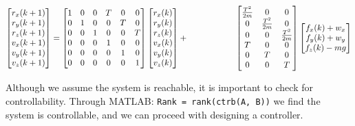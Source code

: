 \documentclass[conference, tikz]{IEEEtran}
\begin{document}
\begin{equation}
    \begin{bmatrix}
        r_x(k+1)\\
        r_y(k+1)\\
        r_z(k+1)\\
        v_x(k+1)\\
        v_y(k+1)\\
        v_z(k+1)\\
    \end{bmatrix}
    =
    \begin{bmatrix}
       1 & 0 & 0 & T & 0 & 0\\
       0 & 1 & 0 & 0 & T & 0\\
       0 & 0 & 1 & 0 & 0 & T\\
       0 & 0 & 0 & 1 & 0 & 0\\
       0 & 0 & 0 & 0 & 1 & 0\\
       0 & 0 & 0 & 0 & 0 & 1
    \end{bmatrix}
    \begin{bmatrix}
        r_x(k)\\
        r_y(k)\\
        r_z(k)\\
        v_x(k)\\
        v_y(k)\\
        v_z(k)\\
    \end{bmatrix}
    +
    \hspace*{2cm}

    \begin{bmatrix}
        \frac{T^2}{2m} & 0 & 0\\
        0 & \frac{T^2}{2m} & 0\\
        0 & 0 & \frac{T^2}{2m}\\
        T & 0 & 0\\
        0 & T & 0\\
        0 & 0 & T
    \end{bmatrix}
    \begin{bmatrix}
        f_x(k)+w_x\\
        f_y(k)+w_y\\
        f_z(k)-mg\\
    \end{bmatrix}


    \label{eq:1}
\end{equation}

Although we assume the system is reachable, it is important to check for controllability. 
Through MATLAB: \verb|Rank = rank(ctrb(A, B))| we find the system is controllable, and we can proceed with designing a controller. 
\end{document}
